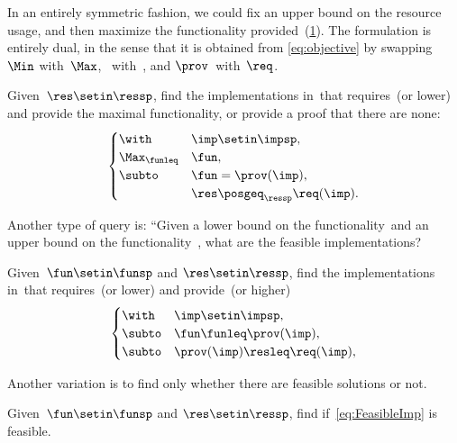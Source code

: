 In an entirely symmetric fashion, we could fix an upper bound on the resource usage, and then maximize the functionality provided~(\cref{fig:funresuplow_2}).
The formulation is entirely dual, in the sense that it is obtained from \cref{eq:objective} by swapping~$\Min$ with~$\Max$, \funsp~with~\ressp, and $\prov$~with~$\req$.

\begin{problem}[\FixResMaxFun]
\label{prob:FixResMaxFun}
Given~$\res\setin\ressp$, find the implementations in~\impsp that requires~\res (or lower) and provide the maximal functionality, or provide a proof that there are none:
\begin{equation}
    \begin{cases}
        \with          & \imp\setin\impsp,               \\
        \Max_{\funleq} & \fun,                           \\
        \subto         & \fun=\prov(\imp),               \\
                       & \res\posgeq_{\ressp}\req(\imp).
    \end{cases}\label{eq:objective-1}
\end{equation}
\end{problem}


\begin{figure}
    \centering
    \caption{}
    \label{fig:funresuplow_2}
\end{figure}

Another type of query is: ``Given a lower bound on the functionality~\fun and an upper bound on the functionality~\fun, what are the feasible implementations?

\begin{problem}[\FeasibleImp]
\label{prob:FeasibleImp}
Given~$\fun\setin\funsp$ and $\res\setin\ressp$, find the implementations in~\impsp that requires~\res (or lower) and provide~\fun (or higher)
\begin{equation}
    \label{eq:FeasibleImp}
    \begin{cases}
        \with  & \imp\setin\impsp,               \\
        \subto & \fun \funleq \prov(\imp),       \\
        \subto & \prov(\imp) \resleq \req(\imp), \\
    \end{cases}
\end{equation}
\end{problem}

Another variation is to find only whether there are feasible solutions or not.

\begin{problem}[\Feasibility]
\label{prob:Feasibility}
Given~$\fun\setin\funsp$ and $\res\setin\ressp$, find if~\cref{eq:FeasibleImp} is feasible.
\end{problem}
